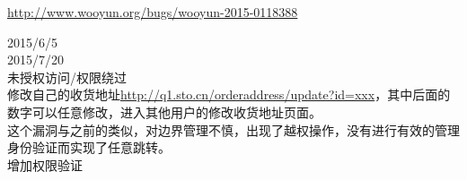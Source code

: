 \documentclass{leptc}
\begin{document}
\begin{center}
\end{center}
\begin{center}
	\url{http://www.wooyun.org/bugs/wooyun-2015-0118388}
\end{center}
 2015/6/5 \\
 2015/7/20 \\
 未授权访问/权限绕过 \\
 修改自己的收货地址\url{http://q1.sto.cn/orderaddress/update?id=xxx}，其中后面的数字可以任意修改，进入其他用户的修改收货地址页面。\\
 这个漏洞与之前的类似，对边界管理不慎，出现了越权操作，没有进行有效的管理身份验证而实现了任意跳转。\\
 增加权限验证 \\
\end{document}
